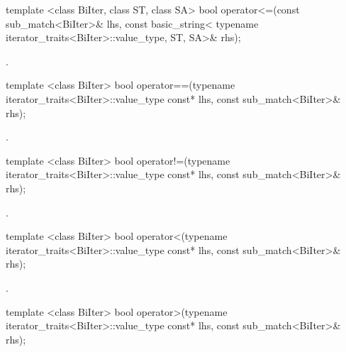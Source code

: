 %
%
\begin{itemdecl}
template <class BiIter, class ST, class SA>
  bool operator<=(const sub_match<BiIter>& lhs,
                  const basic_string<
                    typename iterator_traits<BiIter>::value_type, ST, SA>& rhs);
\end{itemdecl}

\begin{itemdescr}
\pnum\returns  {}.
\end{itemdescr}

%
%
\begin{itemdecl}
template <class BiIter> 
  bool operator==(typename iterator_traits<BiIter>::value_type const* lhs, 
                  const sub_match<BiIter>& rhs); 
\end{itemdecl}

\begin{itemdescr}
\pnum\returns  {}.
\end{itemdescr}

%
%
\begin{itemdecl}
template <class BiIter> 
  bool operator!=(typename iterator_traits<BiIter>::value_type const* lhs, 
                  const sub_match<BiIter>& rhs); 
\end{itemdecl}

\begin{itemdescr}
\pnum\returns  {}.
\end{itemdescr}

%
%
\begin{itemdecl}
template <class BiIter> 
  bool operator<(typename iterator_traits<BiIter>::value_type const* lhs, 
                 const sub_match<BiIter>& rhs); 
\end{itemdecl}

\begin{itemdescr}
\pnum\returns  {}.
\end{itemdescr}

%
%
\begin{itemdecl}
template <class BiIter> 
  bool operator>(typename iterator_traits<BiIter>::value_type const* lhs, 
                 const sub_match<BiIter>& rhs); 
\end{itemdecl}

